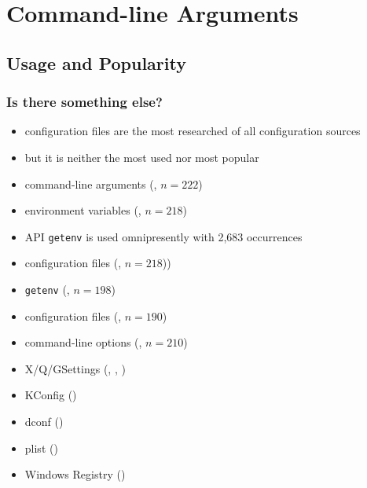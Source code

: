 \section{Command-line Arguments}

\subsection{Usage and Popularity}

\begin{frame}
	\frametitle{Is there something else?}
	\begin{itemize}
	\item configuration files are the most researched of all configuration sources~\cite{jin2014configurations}
	\item but it is neither the most used nor most popular~\cite{raab2017challenges}
	\end{itemize}
\end{frame}

\begin{frame}
	\methodQuestion{} 
	\begin{itemize}
	\item command-line arguments (, $n=222$)
	\item environment variables (, $n=218$)
	\item \methodSource{} API \texttt{getenv} is used omnipresently with 2,683 occurrences
	\item configuration files (, $n=218$))
	\end{itemize}
\end{frame}


\begin{frame}
	\methodQuestion{} 
	\begin{itemize}
	\item \texttt{getenv} (, $n=198$)
	\item configuration files (, $n=190$)
	\item command-line options (, $n=210$)
	\item X/Q/GSettings (, , )
	\item KConfig ()
	\item dconf ()
	\item plist ()
	\item Windows Registry ()
	\end{itemize}
\end{frame}


